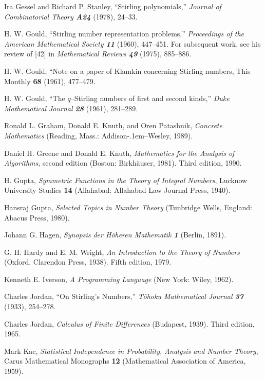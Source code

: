 \bib
[11]\enspace
Ira Gessel and Richard P. Stanley, ``Stirling polynomials,'' {\sl
Journal of Combinatorial Theory\/ \bf A24} (1978), 24--33.

\bib
[12]\enspace
H. W. Gould, ``Stirling number representation problems,'' {\sl
Proceedings of the American Mathematical Society\/ \bf 11} (1960),
447--451. For subsequent work, see his review of [42] in {\sl
Mathematical Reviews\/ \bf 49} (1975), 885--886.

\bib
[13]\enspace
H. W. Gould, ``Note on a paper of Klamkin concerning Stirling numbers,
This {\sc Monthly} {\bf 68} (1961), 477--479.

\bib
[14]\enspace
H. W. Gould, ``The $q$--Stirling numbers  of first and second kinds,''
{\sl Duke Mathematical Journal\/ \bf 28} (1961), 281--289.

\bib
[15]\enspace
Ronald L. Graham, Donald E. Knuth, and Oren Patashnik, {\sl Concrete
Mathematics\/} (Reading, Mass.: Addison\kern-.1em--Wesley, 1989).

\bib
[16]\enspace
Daniel H. Greene and Donald E. Knuth, {\sl Mathematics for the
Analysis of Algorithms}, second edition (Boston: Birkh\"auser, 1981).
Third edition, 1990.

\bib
[17]\enspace
H. Gupta, {\sl Symmetric Functions in the Theory of Integral Numbers},
Lucknow University Studies {\bf 14} (Allahabad: Allahabad Law Journal
Press, 1940).

\bib
[18]\enspace
Hansraj Gupta, {\sl Selected Topics in Number Theory\/} (Tunbridge
Wells, England: Abacus Press, 1980).

\bib
[19]\enspace
Johann G. Hagen, {\sl Synopsis der H\"oheren Mathematik\/ \bf 1}
(Berlin, 1891).

\bib
[20]\enspace
G. H. Hardy and E. M. Wright, {\sl An Introduction to the Theory of
Numbers\/} (Oxford, Clarendon Press, 1938). Fifth edition, 1979.

\bib
[21]\enspace
Kenneth E. Iverson, {\sl A Programming Language\/} (New York: Wiley,
1962). 

\bib
[22]\enspace
Charles Jordan, ``On Stirling's Numbers,'' {\sl T{\^o}hoku
Mathematical Journal\/ \bf 37} (1933), 254--278.

\bib
[23]\enspace
Charles Jordan, {\sl Calculus of Finite Differences}
(Budapest, 1939). Third edition, 1965.

\bib
[24]\enspace
Mark Kac, {\sl Statistical Independence in Probability, Analysis and
Number Theory}, Carus Mathematical Monographs {\bf 12} (Mathematical
Association of America, 1959).

